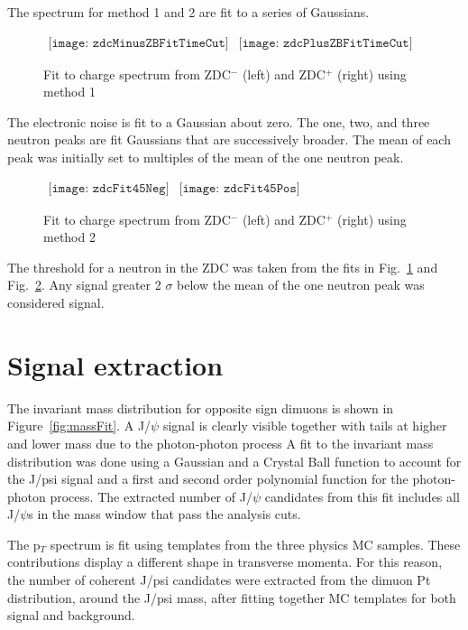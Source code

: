       The spectrum for method 1 and 2 are fit to a series of Gaussians.
      \begin{figure}[!Hh]
        \centering
        $ \begin{array}{cc}
          \texttt{[image: zdcMinusZBFitTimeCut]} &
          \texttt{[image: zdcPlusZBFitTimeCut]}
        \end{array} $
        \caption{Fit to charge spectrum from ZDC$^{-}$ (left) and ZDC$^{+}$ (right) using 
          method 1}
        \label{fig:zdcM1Fit}
      \end{figure}
      The electronic noise is fit to a Gaussian about zero.
      The one, two, and three neutron peaks are fit Gaussians that are 
        successively broader.
      The mean of each peak was initially set to multiples of the mean of the 
        one neutron peak. 
      \begin{figure}[!Hh]
        \centering
        $ \begin{array}{cc}
          \texttt{[image: zdcFit45Neg]} &
          \texttt{[image: zdcFit45Pos]}
        \end{array} $
        \caption{Fit to charge spectrum from ZDC$^{-}$ (left) and ZDC$^{+}$ (right) using 
          method 2}
        \label{fig:zdcM2Fit}
      \end{figure}
      The threshold for a neutron in the ZDC was taken from the fits in 
        Fig.~\ref{fig:zdcM1Fit} and Fig.~\ref{fig:zdcM2Fit}.
      Any signal greater 2 $\sigma$ below the mean of the one neutron peak was 
        considered signal. 

  \section{\label{sec:sigEx} Signal extraction}
    The invariant mass distribution for opposite sign dimuons is shown in 
      Figure~\ref{fig:massFit}. 
    A J/$\psi$ signal is clearly visible together with tails at higher and lower mass
      due to the photon-photon process
    A fit to the invariant mass distribution was done using a Gaussian and a Crystal Ball
      function to account for the J/psi signal and a first and second order polynomial 
      function for the photon-photon process.
    The extracted number of J/$\psi$ candidates from this fit includes all J/$\psi$s in
      the mass window that pass the analysis cuts. 
    
    The p$_{T}$ spectrum is fit using templates from the three physics MC samples. 
    These contributions display a different shape in transverse momenta. 
    For this reason, the number of coherent J/psi candidates were extracted 
      from the dimuon Pt distribution, around the J/psi mass, after fitting 
      together MC templates for both signal and background.

